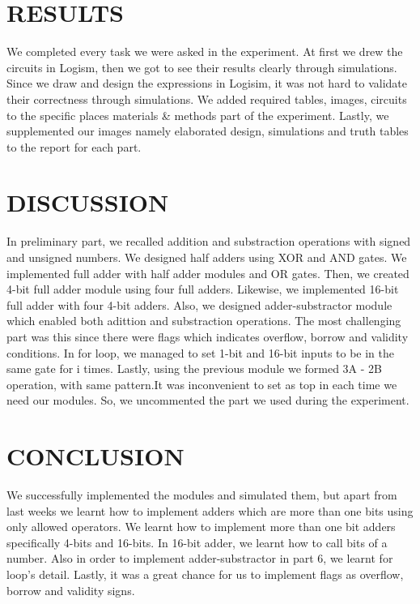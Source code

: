 \documentclass[pdftex,12pt,a4paper]{article}
\begin{document}
\section{RESULTS }
We completed every task we were asked in the experiment. At first we drew the circuits in Logism, then we got to see their results clearly through simulations. Since we draw and design the expressions in Logisim, it was not hard to validate their correctness through simulations. We added required tables, images, circuits to the specific places materials & methods part of the experiment. Lastly, we supplemented our images namely elaborated design, simulations and truth tables to the report for each part.


\section{DISCUSSION }
In preliminary part, we recalled addition and substraction operations with signed and unsigned numbers. We designed half adders using XOR and AND gates. We implemented full adder with half adder modules and OR gates. Then, we created 4-bit full adder module using four full adders. Likewise, we implemented 16-bit full adder with four 4-bit adders. Also, we designed adder-substractor module which enabled both adittion and substraction operations. The most challenging part was this since there were flags which indicates overflow, borrow and validity conditions. In for loop, we managed to set 1-bit and 16-bit inputs to be in the same gate for i times. Lastly, using the previous module we formed 3A - 2B operation, with same pattern.It was inconvenient to set as top in each time we need our modules. So, we uncommented the part we used during the experiment.


\section{CONCLUSION}
We successfully implemented the modules and simulated them, but apart from last weeks we learnt how to implement adders which are more than one bits using only allowed operators. We learnt how to implement more than one bit adders specifically 4-bits and 16-bits. In 16-bit adder, we learnt how to call bits of a number. Also in order to implement adder-substractor in part 6, we learnt for loop's detail. Lastly, it was a great chance for us to implement flags as overflow, borrow and validity signs.




\nocite{ref1}
\nocite{overleaf}
\end{document}
